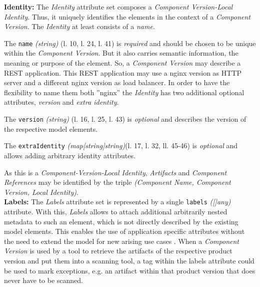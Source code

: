 \textbf{Identity:} The \emph{Identity} attribute set composes a \emph{Component Version-Local Identity}. Thus, it uniquely identifies the elements in the context of a \emph{Component Version}. The \emph{Identity} at least consists of a \emph{name}.\par 
The \lstinline|name| \emph{(string)}  (l. 10, l. 24, l. 41) is \emph{required} and should be chosen to be unique within the \emph{Component Version}. But it also carries semantic information, the meaning or purpose of the element. So, a \emph{Component Version} may describe a REST application. This REST application may use a nginx version as HTTP server and a different nginx version as load balancer. In order to have the flexibility to name them both ''nginx'' the \emph{Identity} has two additional optional attributes, \emph{version} and \emph{extra identity}.\par
The \lstinline|version| \emph{(string)} (l. 16, l. 25, l. 43) is \emph{optional} and describes the version of the respective model elements.\par
The \lstinline|extraIdentity| \emph{(map[string]string)}(l. 17, l. 32, ll. 45-46) is \emph{optional} and allows adding arbitrary identity attributes.\par
As this is a \emph{Component-Version-Local Identity}, \emph{Artifacts} and \emph{Component References} may be identified by the triple \emph{({Component Name}, {Component Version}, {Local Identity})}.\\

\textbf{Labels:} The \emph{Labels} attribute set is represented by a single \lstinline|labels| \emph{([]any)} attribute. With this, \emph{Labels} allows to attach additional arbitrarily nested metadata to such an element, which is not directly described by the existing model elements. This enables the use of application specific attributes without the need to extend the model for new arising use cases \cite{OCMSpec}. When a \emph{Component Version} is used by a tool to retrieve the artifacts of the respective product version and put them into a scanning tool, a tag within the labels attribute could be used to mark exceptions, e.g. an artifact within that product version that does never have to be scanned.\\\\

